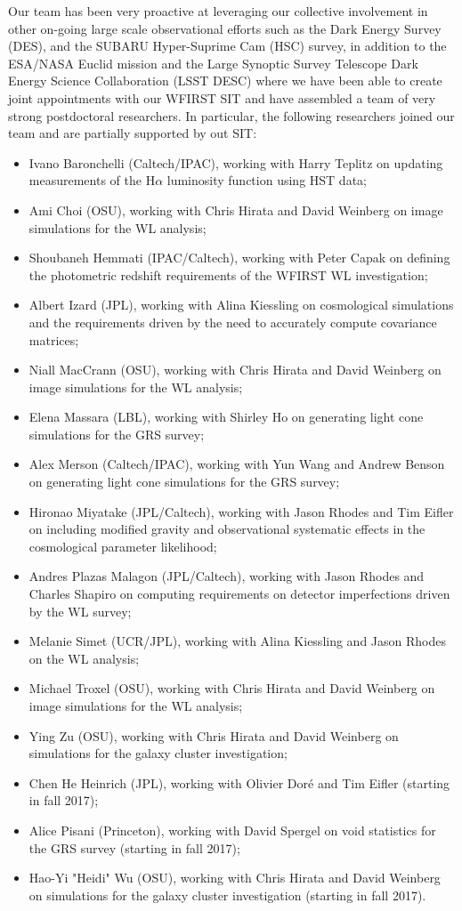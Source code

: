Our team has been very proactive at leveraging our collective involvement in other on-going large scale observational efforts such as the Dark Energy Survey (DES), and the SUBARU Hyper-Suprime Cam (HSC) survey, in addition to the ESA/NASA Euclid mission and the Large Synoptic Survey Telescope Dark Energy Science Collaboration (LSST DESC) where we have been able to create joint appointments with our WFIRST SIT and have assembled a team of very strong postdoctoral researchers. In particular, the following researchers joined our team and are partially supported by out SIT:
\begin{itemize}
\item Ivano Baronchelli (Caltech/IPAC), working with Harry Teplitz on updating measurements of the H$\alpha$ luminosity function using HST data;
\item Ami Choi (OSU), working with Chris Hirata and David Weinberg on image simulations for the WL analysis;
\item Shoubaneh Hemmati (IPAC/Caltech), working with Peter Capak on defining the photometric redshift requirements of the WFIRST WL investigation;
\item Albert Izard (JPL), working with Alina Kiessling on cosmological simulations and the requirements driven by the need to accurately compute covariance matrices;
\item Niall MacCrann (OSU), working with Chris Hirata and David Weinberg on image simulations for the WL analysis;
\item Elena Massara (LBL), working with Shirley Ho on generating light cone simulations for the GRS survey;
\item Alex Merson (Caltech/IPAC), working with Yun Wang and Andrew Benson on generating light cone simulations for the GRS survey;
\item Hironao Miyatake (JPL/Caltech), working with Jason Rhodes and Tim Eifler on including modified gravity and observational systematic effects in the cosmological parameter likelihood;
\item Andres Plazas Malagon (JPL/Caltech), working with Jason Rhodes and Charles Shapiro on computing requirements on detector imperfections driven by the WL survey;
\item Melanie Simet (UCR/JPL), working with Alina Kiessling and Jason Rhodes on the WL analysis;
\item Michael Troxel (OSU), working with Chris Hirata and David Weinberg on image simulations for the WL analysis;
\item Ying Zu (OSU), working with Chris Hirata and David Weinberg on simulations for the galaxy cluster investigation;
\item Chen He Heinrich (JPL), working with Olivier Dor\'e and Tim Eifler (starting in fall 2017);
\item Alice Pisani (Princeton), working with David Spergel on void statistics for the GRS survey (starting in fall 2017);
\item Hao-Yi "Heidi" Wu (OSU), working with Chris Hirata and David Weinberg on simulations for the galaxy cluster investigation (starting in fall 2017).
\end{itemize}

